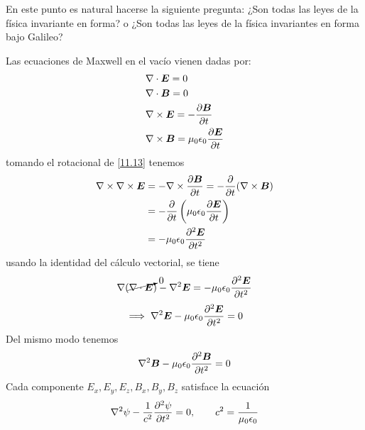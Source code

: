  En este punto es natural hacerse la siguiente pregunta: ¿Son todas las leyes de la física invariante en forma? o ¿Son todas las leyes de la física invariantes en forma bajo Galileo?
 
 Las ecuaciones de Maxwell en el vacío vienen dadas por:
 \begin{align}
  &\nabla\cdot\vb*{E}=0\label{11.11}\\
  &\nabla\cdot\vb*{B}=0\label{11.12}\\
  &\nabla\times \vb*{E}=-\pdv{\vb*{B}}{t}\label{11.13}\\
  &\nabla\times \vb*{B}=\mu_0\epsilon_0\pdv{\vb*{E}}{t}\label{11.14}
\end{align}
tomando el rotacional de \eqref{11.13} tenemos
\begin{align}
  \nabla\times \nabla \times\vb*{E}&=-\nabla\times \pdv{\vb*{B}}{t}=-\pdv{t}(\nabla\times\vb*{B})\\
  &=-\pdv{t}\left(\mu_0\epsilon_0\pdv{\vb*{E}}{t}\right)\\
  &=-\mu_0\epsilon_0\pdv[2]{\vb*{E}}{t}
\end{align}
usando la identidad del cálculo vectorial, se tiene
\begin{align}
  \nabla(\cancelto{0}{\nabla\cdot\vb*{E}})-\nabla^2\vb*{E}=-\mu_0\epsilon_0\pdv[2]{\vb*{E}}{t}
\end{align}
\begin{equation}
  \implies \nabla^2\vb*{E}-\mu_0\epsilon_0\pdv[2]{\vb*{E}}{t}=0
\end{equation}
Del mismo modo tenemos
\begin{equation}
  \nabla^2\vb*{B}-\mu_0\epsilon_0\pdv[2]{\vb*{B}}{t}=0
\end{equation}
Cada componente $E_x,E_y,E_z,B_x,B_y,B_z$ satisface la ecuación
\begin{equation}\label{11.onda}
  \nabla^2\psi-\frac{1}{c^2}\pdv[2]{\psi}{t}=0,\qquad c^2=\frac{1}{\mu_0\epsilon_0}
\end{equation}



